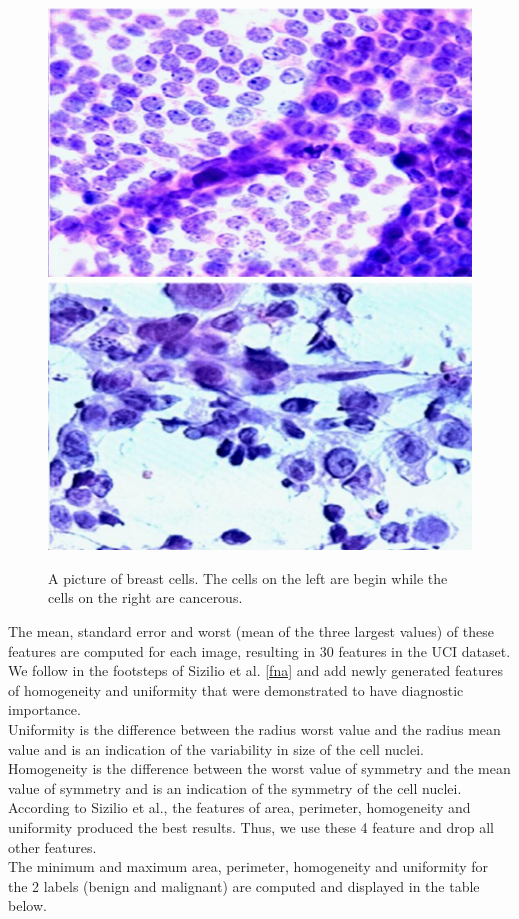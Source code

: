 \begin{figure}[h!]
	\centering
	\includegraphics[width=0.4\linewidth]{screenshot001}
	\hspace{0.5cm}
	\includegraphics[width=0.4\linewidth]{screenshot002}
	\caption{A picture of breast cells. The cells on the left are begin while the cells on the right are cancerous.}
	\label{fig:images}
\end{figure}

\newpage

The mean, standard error and worst (mean of the three largest values) of these features are computed for each image, resulting in 30 features in the UCI dataset. \\

We follow in the footsteps of Sizilio et al. \ref{fna} and add newly generated features of homogeneity and uniformity that were demonstrated to have diagnostic importance. \\

Uniformity is the difference between the radius worst value and the radius mean value and is an indication of the variability in size of the cell nuclei. \\

Homogeneity is the difference between the worst value of symmetry and the mean value of symmetry and is an indication of the symmetry of the cell nuclei. \\

According to Sizilio et al., the features of area, perimeter, homogeneity and uniformity produced the best results. Thus, we use these 4 feature and drop all other features. \\

\iffalse
The minimum and maximum area, perimeter, homogeneity and uniformity for the 2 labels (benign and malignant) are computed and displayed in the table below. \\

